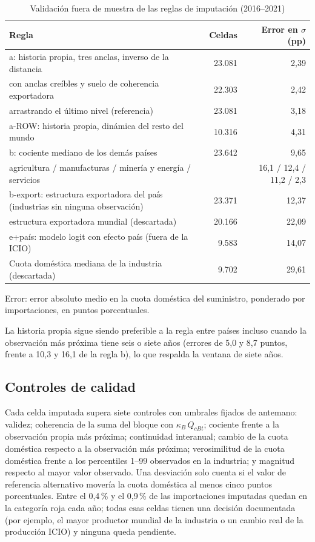 \documentclass[final,1p,times,authoryear]{elsarticle}
\begin{document}
\begin{table}[!t]
\caption{Validación fuera de muestra de las reglas de imputación (2016--2021)}\label{tab:diag-validacion}
\centering
\footnotesize
\begin{tabularx}{\textwidth}{@{}Xrr@{}}
\toprule
\textbf{Regla} & \textbf{Celdas} & \textbf{Error en $\sigma$ (pp)} \\
\midrule
a: historia propia, tres anclas, inverso de la distancia & 23.081 & 2,39 \\
\quad con anclas creíbles y suelo de coherencia exportadora & 22.303 & 2,42 \\
\quad arrastrando el último nivel (referencia) & 23.081 & 3,18 \\
a-ROW: historia propia, dinámica del resto del mundo & 10.316 & 4,31 \\
b: cociente mediano de los demás países & 23.642 & 9,65 \\
\quad agricultura / manufacturas / minería y energía / servicios & & 16,1 / 12,4 / 11,2 / 2,3 \\
b-export: estructura exportadora del país (industrias sin ninguna observación) & 23.371 & 12,37 \\
\quad estructura exportadora mundial (descartada) & 20.166 & 22,09 \\
e+país: modelo logit con efecto país (fuera de la ICIO) & 9.583 & 14,07 \\
Cuota doméstica mediana de la industria (descartada) & 9.702 & 29,61 \\
\bottomrule
\end{tabularx}
\par\smallskip\parbox{\linewidth}{\footnotesize Error: error absoluto medio en la cuota doméstica del suministro, ponderado por importaciones, en puntos porcentuales.}
\end{table}

La historia propia sigue siendo preferible a la regla entre países incluso cuando la observación más próxima tiene seis o siete años (errores de 5,0 y 8,7 puntos, frente a 10,3 y 16,1 de la regla b), lo que respalda la ventana de siete años.

\subsection{Controles de calidad}
Cada celda imputada supera siete controles con umbrales fijados de antemano: validez; coherencia de la suma del bloque con $\kappa_B\,Q_{cBt}$; cociente frente a la observación propia más próxima; continuidad interanual; cambio de la cuota doméstica respecto a la observación más próxima; verosimilitud de la cuota doméstica frente a los percentiles 1--99 observados en la industria; y magnitud respecto al mayor valor observado. Una desviación solo cuenta si el valor de referencia alternativo movería la cuota doméstica al menos cinco puntos porcentuales. Entre el 0,4\,\% y el 0,9\,\% de las importaciones imputadas quedan en la categoría roja cada año; todas esas celdas tienen una decisión documentada (por ejemplo, el mayor productor mundial de la industria o un cambio real de la producción ICIO) y ninguna queda pendiente.
\end{document}
